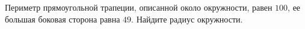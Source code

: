 \begin{ex}
	\begin{condition}
		Периметр прямоугольной трапеции, описанной около окружности, равен \( 100 \), ее большая боковая сторона равна \( 49 \). Найдите радиус окружности.
	\end{condition}
\end{ex}